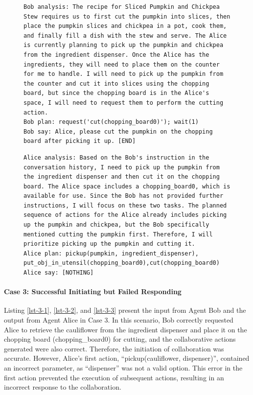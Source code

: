 \documentclass[11pt]{article}
\begin{document}
\begin{figure}[H]

\begin{lstlisting}[caption={Case 2 Agent Bob's output},label={lst-2-2}]
Bob analysis: The recipe for Sliced Pumpkin and Chickpea Stew requires us to first cut the pumpkin into slices, then place the pumpkin slices and chickpea in a pot, cook them, and finally fill a dish with the stew and serve. The Alice is currently planning to pick up the pumpkin and chickpea from the ingredient dispenser. Once the Alice has the ingredients, they will need to place them on the counter for me to handle. I will need to pick up the pumpkin from the counter and cut it into slices using the chopping board, but since the chopping board is in the Alice's space, I will need to request them to perform the cutting action.  
Bob plan: request('cut(chopping_board0)'); wait(1)
Bob say: Alice, please cut the pumpkin on the chopping board after picking it up. [END]
\end{lstlisting}
\end{figure}


\begin{figure}[H]
\begin{lstlisting}[caption={Case 2 Agent Alice's output},label={lst-2-3}]
Alice analysis: Based on the Bob's instruction in the conversation history, I need to pick up the pumpkin from the ingredient dispenser and then cut it on the chopping board. The Alice space includes a chopping_board0, which is available for use. Since the Bob has not provided further instructions, I will focus on these two tasks. The planned sequence of actions for the Alice already includes picking up the pumpkin and chickpea, but the Bob specifically mentioned cutting the pumpkin first. Therefore, I will prioritize picking up the pumpkin and cutting it.
Alice plan: pickup(pumpkin, ingredient_dispenser), put_obj_in_utensil(chopping_board0),cut(chopping_board0)
Alice say: [NOTHING]
\end{lstlisting}
\end{figure}

\paragraph{Case 3: Successful Initiating but Failed Responding}

Listing \ref{lst-3-1}, \ref{lst-3-2}, and \ref{lst-3-3} present the input from Agent Bob and the output from Agent Alice in Case 3. In this scenario, Bob correctly requested Alice to retrieve the cauliflower from the ingredient dispenser and place it on the chopping board (chopping\_board0) for cutting, and the collaborative actions generated were also correct. Therefore, the initiation of collaboration was accurate. However, Alice's first action, ``pickup(cauliflower, dispenser)'', contained an incorrect parameter, as ``dispenser'' was not a valid option. This error in the first action prevented the execution of subsequent actions, resulting in an incorrect response to the collaboration.
\end{document}
